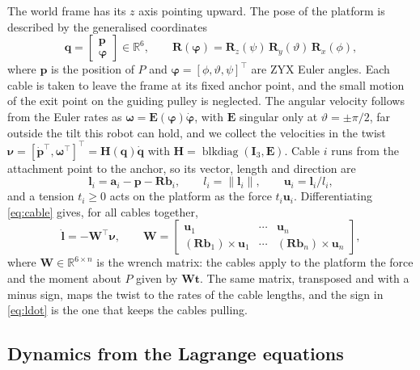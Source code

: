 \documentclass{interact}
\newcommand{\vc}[1]{\bm{#1}}
\newcommand{\mt}[1]{\mathbf{#1}}
\newcommand{\eye}{\mt{I}}
\begin{document}
The world frame has its $z$ axis pointing upward. The pose of the platform is described by the generalised coordinates
\begin{equation}\label{eq:q}
\vc q=\begin{bmatrix}\vc p\\ \vc\varphi\end{bmatrix}\in\mathbb R^{6},\qquad \mt R(\vc\varphi)=\mt R_z(\psi)\,\mt R_y(\vartheta)\,\mt R_x(\phi),
\end{equation}
where $\vc p$ is the position of $P$ and $\vc\varphi=[\phi,\vartheta,\psi]^\top$ are ZYX Euler angles. Each cable is taken to leave the frame at its fixed anchor point, and the small motion of the exit point on the guiding pulley is neglected. The angular velocity follows from the Euler rates as $\vc\omega=\mt E(\vc\varphi)\dot{\vc\varphi}$, with $\mt E$ singular only at $\vartheta=\pm\pi/2$, far outside the tilt this robot can hold, and we collect the velocities in the twist $\vc\nu=[\dot{\vc p}^\top,\vc\omega^\top]^\top=\mt H(\vc q)\dot{\vc q}$ with $\mt H=\operatorname{blkdiag}(\eye_3,\mt E)$. Cable $i$ runs from the attachment point to the anchor, so its vector, length and direction are
\begin{equation}\label{eq:cable}
\vc l_i=\vc a_i-\vc p-\mt R\vc b_i,\qquad l_i=\lVert\vc l_i\rVert,\qquad \vc u_i=\vc l_i/l_i,
\end{equation}
and a tension $t_i\ge0$ acts on the platform as the force $t_i\vc u_i$. Differentiating \eqref{eq:cable} gives, for all cables together,
\begin{equation}\label{eq:ldot}
\dot{\vc l}=-\mt W^\top\vc\nu,\qquad
\mt W=\begin{bmatrix}\vc u_1&\cdots&\vc u_n\\ (\mt R\vc b_1)\times\vc u_1&\cdots&(\mt R\vc b_n)\times\vc u_n\end{bmatrix},
\end{equation}
where $\mt W\in\mathbb R^{6\times n}$ is the wrench matrix: the cables apply to the platform the force and the moment about $P$ given by $\mt W\vc t$. The same matrix, transposed and with a minus sign, maps the twist to the rates of the cable lengths, and the sign in \eqref{eq:ldot} is the one that keeps the cables pulling.

\subsection{Dynamics from the Lagrange equations}\label{sec:lagrange}
\end{document}
